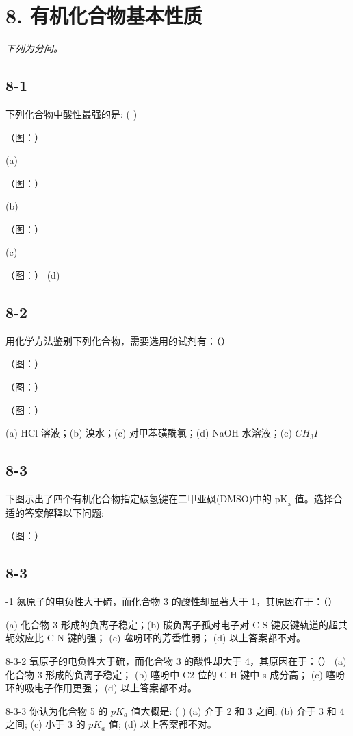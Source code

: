 \section*{8. 有机化合物基本性质}
\textit{下列为分问。}

\subsection*{8-1}
下列化合物中酸性最强的是: ( )

（图：）

(a)

（图：）

(b)

（图：）

(c)

（图：）
(d)

\subsection*{8-2}
用化学方法鉴别下列化合物，需要选用的试剂有：（）

（图：）

（图：）

（图：）

(a) HCl 溶液；(b) 溴水；(c) 对甲苯磺酰氯；(d) NaOH 水溶液；(e) $CH_{3}I$

\subsection*{8-3}
下图示出了四个有机化合物指定碳氢键在二甲亚砜(DMSO)中的 $\mathrm{pK}_{\mathrm{a}}$ 值。选择合适的答案解释以下问题:

（图：）

\subsection*{8-3}
-1 氮原子的电负性大于硫，而化合物 3 的酸性却显著大于 1，其原因在于：（）

(a) 化合物 3 形成的负离子稳定；(b) 碳负离子孤对电子对 C-S 键反键轨道的超共轭效应比 C-N 键的强；
(c) 噬吩环的芳香性弱； (d) 以上答案都不对。

8-3-2 氧原子的电负性大于硫，而化合物 3 的酸性却大于 4，其原因在于：（）
(a) 化合物 3 形成的负离子稳定； (b) 噻吩中 C2 位的 C-H 键中 s 成分高；
(c) 噻吩环的吸电子作用更强； (d) 以上答案都不对。

8-3-3 你认为化合物 5 的 $pK_{a}$ 值大概是: ( )
(a) 介于 2 和 3 之间; (b) 介于 3 和 4 之间; (c) 小于 3 的 $pK_{a}$ 值; (d) 以上答案都不对。

